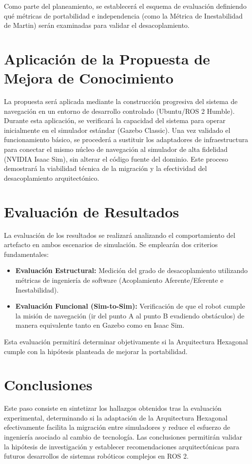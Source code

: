 Como parte del planeamiento, se establecerá el esquema de evaluación definiendo qué métricas de portabilidad e independencia (como la Métrica de Inestabilidad de Martin) serán examinadas para validar el desacoplamiento.

\section{Aplicación de la Propuesta de Mejora de Conocimiento}

La propuesta será aplicada mediante la construcción progresiva del sistema de navegación en un entorno de desarrollo controlado (Ubuntu/ROS 2 Humble). Durante esta aplicación, se verificará la capacidad del sistema para operar inicialmente en el simulador estándar (Gazebo Classic). Una vez validado el funcionamiento básico, se procederá a sustituir los adaptadores de infraestructura para conectar el mismo núcleo de navegación al simulador de alta fidelidad (NVIDIA Isaac Sim), sin alterar el código fuente del dominio. Este proceso demostrará la viabilidad técnica de la migración y la efectividad del desacoplamiento arquitectónico.

\section{Evaluación de Resultados}

La evaluación de los resultados se realizará analizando el comportamiento del artefacto en ambos escenarios de simulación. Se emplearán dos criterios fundamentales:
\begin{itemize}
    \item \textbf{Evaluación Estructural:} Medición del grado de desacoplamiento utilizando métricas de ingeniería de software (Acoplamiento Aferente/Eferente e Inestabilidad).
    \item \textbf{Evaluación Funcional (Sim-to-Sim):} Verificación de que el robot cumple la misión de navegación (ir del punto A al punto B evadiendo obstáculos) de manera equivalente tanto en Gazebo como en Isaac Sim.
\end{itemize}
Esta evaluación permitirá determinar objetivamente si la Arquitectura Hexagonal cumple con la hipótesis planteada de mejorar la portabilidad.

\section{Conclusiones}

Este paso consiste en sintetizar los hallazgos obtenidos tras la evaluación experimental, determinando si la adaptación de la Arquitectura Hexagonal efectivamente facilita la migración entre simuladores y reduce el esfuerzo de ingeniería asociado al cambio de tecnología. Las conclusiones permitirán validar la hipótesis de investigación y establecer recomendaciones arquitectónicas para futuros desarrollos de sistemas robóticos complejos en ROS 2.
